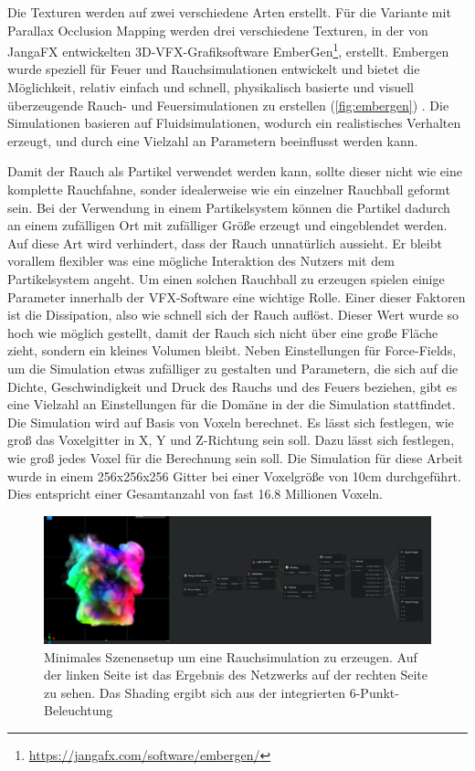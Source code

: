 Die Texturen werden auf zwei verschiedene Arten erstellt. Für die Variante mit Parallax Occlusion Mapping werden drei verschiedene
Texturen, in der von JangaFX entwickelten 3D-VFX-Grafiksoftware EmberGen\footnote{\url{https://jangafx.com/software/embergen/}}, erstellt.
Embergen wurde speziell für Feuer und Rauchsimulationen entwickelt und bietet die Möglichkeit, relativ einfach und schnell, physikalisch basierte und visuell
überzeugende Rauch- und Feuersimulationen zu erstellen (\autoref{fig:embergen}) .
Die Simulationen basieren auf Fluidsimulationen, wodurch ein realistisches Verhalten erzeugt, und durch eine Vielzahl an Parametern beeinflusst werden kann.

Damit der Rauch als Partikel verwendet werden kann, sollte dieser nicht wie eine komplette Rauchfahne, sonder idealerweise wie ein einzelner Rauchball geformt sein.
Bei der Verwendung in einem Partikelsystem können die Partikel dadurch an einem zufälligen Ort mit zufälliger Größe erzeugt und eingeblendet werden. Auf diese
Art wird verhindert, dass der Rauch unnatürlich aussieht. Er bleibt vorallem flexibler was eine mögliche Interaktion des Nutzers mit dem Partikelsystem angeht.
Um einen solchen Rauchball zu erzeugen spielen einige Parameter innerhalb der VFX-Software eine wichtige Rolle. Einer dieser Faktoren ist die Dissipation, also
wie schnell sich der Rauch auflöst. Dieser Wert wurde so hoch wie möglich gestellt, damit der Rauch sich nicht über eine große Fläche zieht, sondern ein kleines Volumen
bleibt. Neben Einstellungen für Force-Fields, um die Simulation etwas zufälliger zu gestalten und Parametern, die sich auf die Dichte, Geschwindigkeit und Druck des Rauchs
und des Feuers beziehen, gibt es eine Vielzahl an Einstellungen für die Domäne in der die Simulation stattfindet. Die Simulation wird auf Basis von Voxeln berechnet.
Es lässt sich festlegen, wie groß das Voxelgitter in X, Y und Z-Richtung sein soll. Dazu lässt sich festlegen, wie groß jedes Voxel für die Berechnung sein soll.
Die Simulation für diese Arbeit wurde in einem 256x256x256 Gitter bei einer Voxelgröße von 10cm durchgeführt. Dies entspricht einer Gesamtanzahl von fast 16.8 Millionen Voxeln.

\begin{figure}[h!]
	\includegraphics[width=\textwidth]{Grafiken/Implementation/embergen.png}
	\centering
	\begin{footnotesize}
		\caption{Minimales Szenensetup um eine Rauchsimulation zu erzeugen. Auf der linken Seite ist das Ergebnis des Netzwerks auf der rechten Seite zu sehen. Das Shading ergibt sich aus der
			integrierten 6-Punkt-Beleuchtung}
		\label{fig:embergen}
	\end{footnotesize}
\end{figure}

